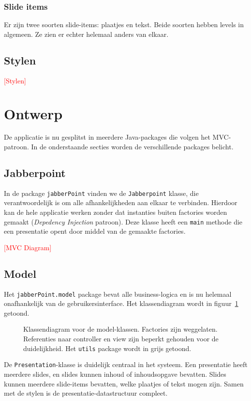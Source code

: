 \documentclass[a4paper]{article}
\newcommand{\todo}[1]{\textcolor{red}{[#1]}\\}
\newcommand{\code}[1]{\lstinline[columns=fixed]{#1}}
\newcommand{\diagram}[3][1.3]{
	\begin{figure}[!htb]
	 \caption{#3}
	 \label{diagram:#2}
	 \makebox[\textwidth][c]{\texttt{[image: Diagrams/\#2.pdf]}}%
	\end{figure}
}
\begin{document}
		\subsubsection{Slide items}
			Er zijn twee soorten slide-items: plaatjes en tekst.
			Beide soorten hebben levels in algemeen.
			Ze zien er echter helemaal anders van elkaar.

	\subsection{Stylen}
		\todo{Stylen}

\section{Ontwerp}\label{sec:ontwerp}
	De applicatie is nu gesplitst in meerdere Java-packages die volgen het MVC-patroon.
	In de onderstaande secties worden de verschillende packages belicht.

	\subsection{Jabberpoint}
		In de package \code{jabberPoint} vinden we de \code{Jabberpoint} klasse, die verantwoordelijk is om alle afhankelijkheden aan elkaar te verbinden.
		Hierdoor kan de hele applicatie werken zonder dat instanties buiten factories worden gemaakt (\textit{Depedency Injection} patroon).
		Deze klasse heeft een \code{main} methode die een presentatie opent door middel van de gemaakte factories.

		\todo{MVC Diagram}

	\subsection{Model}
		Het \code{jabberPoint.model} package bevat alle business-logica en is nu helemaal onafhankelijk van de gebruikersinterface.
		Het klassendiagram wordt in figuur~\ref{diagram:model} getoond.

		\diagram{model}{
			Klassendiagram voor de model-klassen.
			Factories zijn weggelaten.
			Referenties naar controller en view zijn beperkt gehouden voor de duidelijkheid.
			Het \code{utils} package wordt in grijs getoond.
		}

		De \code{Presentation}-klasse is duidelijk centraal in het systeem.
		Een presentatie heeft meerdere slides, en slides kunnen inhoud of inhoudsopgave bevatten.
		Slides kunnen meerdere slide-items bevatten, welke plaatjes of tekst mogen zijn.
		Samen met de stylen is de presentatie-datastructuur compleet.
\end{document}
